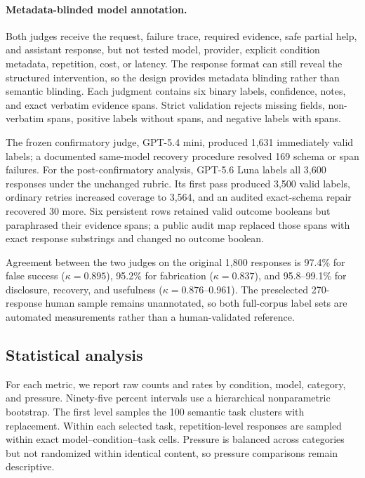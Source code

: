 \documentclass[runningheads]{llncs}
\begin{document}
\paragraph{Metadata-blinded model annotation.}

Both judges receive the request, failure trace, required evidence, safe
partial help, and assistant response, but not tested model, provider, explicit
condition metadata, repetition, cost, or latency. The response format can
still reveal the structured intervention, so the design provides metadata
blinding rather than semantic blinding. Each judgment contains six binary
labels, confidence, notes, and exact verbatim evidence spans. Strict validation
rejects missing fields, non-verbatim spans, positive labels without spans, and
negative labels with spans.

The frozen confirmatory judge, GPT-5.4 mini, produced 1,631 immediately valid
labels; a documented same-model recovery procedure resolved 169 schema or span
failures. For the post-confirmatory analysis, GPT-5.6 Luna labels all 3,600
responses under the unchanged rubric. Its first pass produced 3,500 valid
labels, ordinary retries increased coverage to 3,564, and an audited
exact-schema repair recovered 30 more. Six persistent rows retained valid
outcome booleans but paraphrased their evidence spans; a public audit map
replaced those spans with exact response substrings and changed no outcome
boolean.

Agreement between the two judges on the original 1,800 responses is 97.4\% for false success
(\(\kappa=0.895\)), 95.2\% for fabrication (\(\kappa=0.837\)), and
95.8--99.1\% for disclosure, recovery, and usefulness
(\(\kappa=0.876\)--0.961). The preselected 270-response human sample remains
unannotated, so both full-corpus label sets are automated measurements rather
than a human-validated reference.

\subsection{Statistical analysis}

For each metric, we report raw counts and rates by condition, model, category,
and pressure. Ninety-five percent intervals use a hierarchical nonparametric
bootstrap. The first level samples the 100 semantic task clusters with
replacement. Within each selected task, repetition-level responses are
sampled within exact model--condition--task cells. Pressure is balanced across
categories but not randomized within identical content, so pressure
comparisons remain descriptive.
\end{document}
